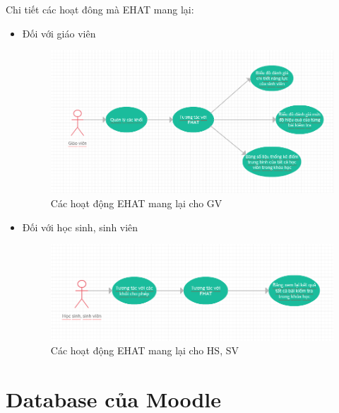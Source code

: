 Chi tiết các hoạt đông mà EHAT mang lại:
\begin{itemize}
	\item Đối với giáo viên
	\begin{center}
		\begin{figure}[htp]
			\begin{center}
				\includegraphics[scale=0.7]{img/chitietehatgv}
			\end{center}
			\caption{Các hoạt động EHAT mang lại cho GV}
			\label{refhinh14}
		\end{figure}
	\end{center}
	\vskip 4cm
	\item Đối với học sinh, sinh viên
	\begin{center}
		\begin{figure}[htp]
			\begin{center}
				\includegraphics[scale=0.7]{img/chitietehaths}
			\end{center}
			\caption{Các hoạt động EHAT mang lại cho HS, SV}
			\label{refhinh15}
		\end{figure}
	\end{center}
\end{itemize}

\section{Database của Moodle}

